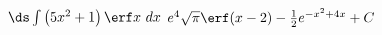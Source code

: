 {$\ds \int \left(5x^2+1\right)\erf x \ dx$}
{$e^4 \sqrt{\pi} \erf(x-2) - \frac{1}{2} e^{-x^2+4x} +C$
}


